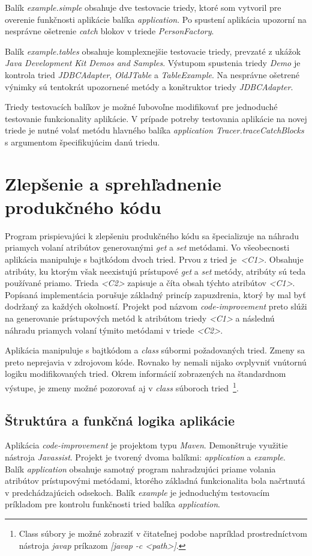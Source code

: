 \documentclass[11pt,final,oneside]{fithesis}
\begin{document}
Balík \textit{example.simple} obsahuje dve testovacie triedy, ktoré som 
vytvoril pre overenie funkčnosti aplikácie balíka \textit{application}. Po 
spustení aplikácia upozorní na nesprávne ošetrenie \textit{catch} blokov v 
triede \textit{PersonFactory}.

Balík \textit{example.tables} obsahuje komplexnejšie testovacie triedy, 
prevzaté z ukážok \textit{Java Development Kit Demos and Samples}. Výstupom 
spustenia triedy \textit{Demo} je kontrola tried \textit{JDBCAdapter}, \textit{
OldJTable} a \textit{TableExample}. Na nesprávne ošetrené výnimky sú tentokrát 
upozornené metódy a konštruktor triedy \textit{JDBCAdapter}.

Triedy testovacích balíkov je možné ľubovoľne modifikovať pre jednoduché 
testovanie funkcionality aplikácie. V prípade potreby testovania aplikácie na 
novej triede je nutné volať metódu hlavného balíka \textit{application
Tracer.traceCatchBlocks}
s argumentom špecifikujúcim danú triedu.

\section{Zlepšenie a sprehľadnenie produkčného kódu}
Program prispievajúci k zlepšeniu produkčného kódu sa špecializuje na náhradu 
priamych volaní atribútov generovanými \textit{get} a \textit{set} metódami. Vo
všeobecnosti aplikácia manipuluje s bajtkódom dvoch tried. Prvou z tried
je~\textit{<C1>}. Obsahuje atribúty, ku ktorým však neexistujú prístupové
\textit{get} a \textit{set} metódy, atribúty sú teda používané priamo. Trieda
\textit{<C2>} zapisuje a číta obsah týchto atribútov
\textit{<C1>}. Popísaná
implementácia porušuje základný princíp zapuzdrenia, ktorý by mal byť dodržaný 
za každých okolností. Projekt pod názvom \textit{code-improvement} preto slúži 
na generovanie prístupových metód k atribútom triedy \textit{<C1>} a následnú 
náhradu priamych volaní týmito metódami v triede \textit{<C2>}.

Aplikácia manipuluje s bajtkódom a \textit{class} súbormi požadovaných tried. 
Zmeny sa preto neprejavia v zdrojovom kóde. Rovnako by nemali nijako ovplyvniť 
vnútornú logiku modifikovaných tried. Okrem informácií zobrazených na 
štandardnom výstupe, je zmeny možné pozorovať aj v \textit{class} súboroch 
tried~\footnote{Class súbory je možné zobraziť v čitateľnej podobe napríklad 
prostredníctvom nástroja \textit{javap} príkazom \textit{[javap -c <path>]}.}.

\subsection{Štruktúra a funkčná logika aplikácie}
Aplikácia \textit{code-improvement} je projektom typu \textit{Maven}. 
Demonštruje využitie nástroja \textit{Javassist}. Projekt je tvorený dvoma 
balíkmi: \textit{application} a \textit{example}. Balík \textit{application} 
obsahuje samotný program nahradzujúci priame volania atribútov prístupovými 
metódami, ktorého základná funkcionalita bola načrtnutá v predchádzajúcich 
odsekoch. Balík \textit{example} je jednoduchým testovacím príkladom pre 
kontrolu funkčnosti tried balíka \textit{application}.
\end{document}

